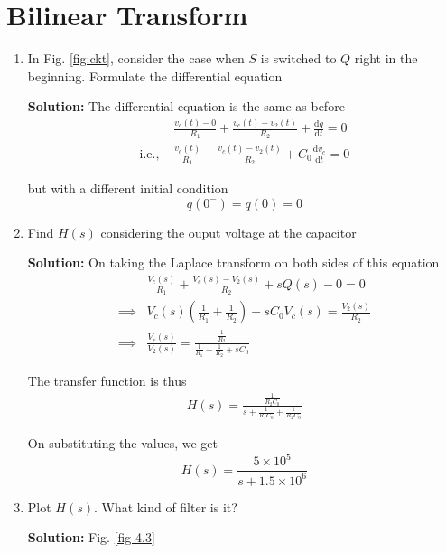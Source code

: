 \documentclass[journal,12pt,twocolumn]{IEEEtran}
\newcommand{\solution}{\noindent \textbf{Solution: }}
\providecommand{\brak}[1]{\ensuremath{\left(#1\right)}}
\providecommand{\der}[1]{\mathrm{d} #1}
\numberwithin{equation}{section}
\numberwithin{figure}{section}
\renewcommand\thesection{\arabic{section}}
\begin{document}
	\section{Bilinear Transform}
	\begin{enumerate}[label=\thesection.\arabic*.,ref=\thesection.\theenumi]
	\item In Fig. \ref{fig:ckt}, consider the case when $S$ is switched to $Q$ right in the beginning. Formulate the differential equation
	
	\solution The differential equation is the same as before 
	\begin{align}
		&\frac{v_c(t) - 0}{R_1} + \frac{v_c(t) - v_2(t)}{R_2} + \frac{\der{q}}{\der{t}} = 0 \\
		\text{i.e., } &\frac{v_c(t)}{R_1} + \frac{v_c(t) - v_2(t)}{R_2} + C_0\frac{\der{v_c}}{\der{t}} = 0
	\end{align}
	
	but with a different initial condition
	\begin{equation}
		q(0^-) = q(0) = 0
	\end{equation}
	
	\item Find $H(s)$ considering the ouput voltage at the capacitor
	
	\solution On taking the Laplace transform on both sides of this equation
	\begin{align}
		&\frac{V_c(s)}{R_1} + \frac{V_c(s) - V_2(s)}{R_2} + sQ(s) - 0 = 0 \\
		\implies &V_c(s) \brak{\frac{1}{R_1} + \frac{1}{R_2}} + sC_0V_c(s) = \frac{V_2(s)}{R_2} \\
		\implies &\frac{V_c(s)}{V_2(s)} = \frac{\frac{1}{R_2}}{\frac{1}{R_1} + \frac{1}{R_2} + sC_0}
	\end{align}
	
	The transfer function is thus
	\begin{align}
		H(s) = \frac{\frac{1}{R_2C_0}}{s + \frac{1}{R_1C_0} + \frac{1}{R_2C_0}}
	\end{align}
	
	On substituting the values, we get
	\begin{equation}
		H(s) = \frac{5 \times 10^5}{s + 1.5 \times 10^6}
	\end{equation}
	
	\item Plot $H(s)$.  What kind of filter is it?
	
	\solution  Fig. \ref{fig-4.3}
	

\end{enumerate}
\end{document}
